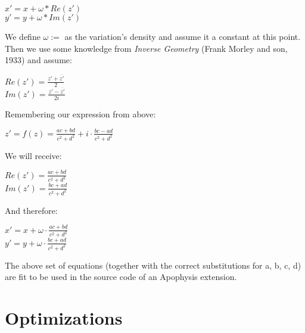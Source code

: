 \documentclass[]{article}
\begin{document}
\begin{flushleft}
	\hspace{20pt} $ x' = x + \omega * Re(z') $\\
	\medskip
	\hspace{20pt} $ y' = y + \omega * Im(z') $
\end{flushleft}

\pagebreak

\noindent We define $\omega:=$ as the variation's density and assume it a constant at this point. Then we use some knowledge from \emph{Inverse Geometry} (Frank Morley and son, 1933) and assume:

\begin{flushleft}
	\hspace{20pt} $ Re(z') = \frac{z' + \overline{z'}}{2} $ \\
	\medskip
	\hspace{20pt} $ Im(z') = \frac{z' - \overline{z'}}{2i} $
\end{flushleft}

\noindent Remembering our expression from above:

\begin{flushleft}
	\hspace{20pt} $ z' = f(z) = \frac{ac + bd}{c^2 + d^2} + i \cdot \frac{bc - ad}{c^2 + d^2}
	 $
\end{flushleft}

\noindent We will receive:

\begin{flushleft}
	\hspace{20pt} $ Re(z') = \frac{ac + bd}{c^2 + d^2} $ \\
	\medskip
	\hspace{20pt} $ Im(z') = \frac{bc + ad}{c^2 + d^2} $
\end{flushleft}

\noindent And therefore:

\begin{flushleft}
	\hspace{20pt} $ x' = x + \omega \cdot \frac{ac + bd}{c^2 + d^2} $ \\
	\medskip
	\hspace{20pt} $ y' = y + \omega \cdot \frac{bc + ad}{c^2 + d^2} $
\end{flushleft}

\noindent The above set of equations (together with the correct substitutions for a, b, c, d) are fit to be used in the source code of an Apophysis extension.

\section{Optimizations}
\end{document}
